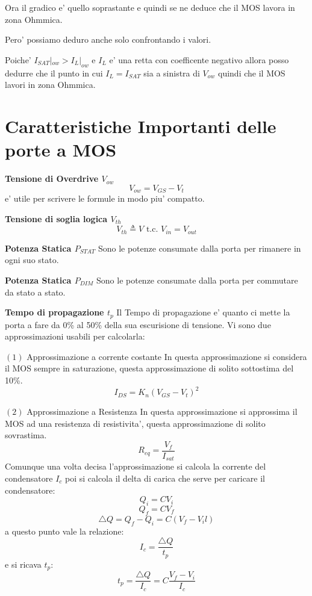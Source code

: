 \documentclass[\main/main.tex]{subfiles}
\begin{document}
Ora il gradico e' quello soprastante e quindi se ne deduce che il MOS lavora in zona Ohmmica.

Pero' possiamo deduro anche solo confrontando i valori.

Poiche' $I_{SAT}|_{ow} > I_{L}|_{ow}$ e $I_L$ e' una retta con coefficente negativo allora posso dedurre che il punto in cui $I_L = I_{SAT}$ sia a sinistra di $V_{ow}$ quindi che il MOS lavori in zona Ohmmica.

\clearpage
\section{Caratteristiche Importanti delle porte a MOS}
\textbf{Tensione di Overdrive $V_{ow}$}
\[ V_{ow} = V_{GS} - V_t\]
e' utile per scrivere le formule in modo piu' compatto.

\textbf{Tensione di soglia logica $V_{th}$}
\[V_{th} \triangleq V \text{ t.c. } V_{in} = V_{out}\]

\textbf{Potenza Statica $P_{STAT}$}
Sono le potenze consumate dalla porta per rimanere in ogni suo stato.

\textbf{Potenza Statica $P_{DIM}$}
Sono le potenze consumate dalla porta per commutare da stato a stato.

\textbf{Tempo di propagazione $t_p$}
Il Tempo di propagazione e' quanto ci mette la porta a fare da 0\% al 50\% della sua escurisione di tensione.
Vi sono due approssimazioni usabili per calcolarla:

$(1)$ Approssimazione a corrente costante
In questa approssimazione si considera il MOS sempre in saturazione, questa approssimazione di solito sottostima del 10\%.
\[ I_{DS} = K_n \left( V_{GS} - V_t \right)^2\]

$(2)$ Approssimazione a Resistenza
In questa approssimazione si approssima il MOS ad una resistenza di resistivita', questa approssimazione di solito sovrastima.
\[R_{eq} = \frac{V_f}{I_{sat}} \]
Comunque una volta decisa l'approssimazione si calcola la corrente del condensatore $I_c$ poi si calcola il delta di carica che serve per caricare il condensatore:
\[Q_i = C V_i\]
\[Q_f = C V_f\]
\[\bigtriangleup Q = Q_f - Q_i = C \left( V_f - V_il\right) \]
a questo punto vale la relazione:
\[I_c = \frac{\bigtriangleup Q}{t_p}\]
e si ricava $t_p$:
\[t_p = \frac{\bigtriangleup Q}{I_c} = C \frac{V_f - V_i}{I_c}\]
\end{document}

